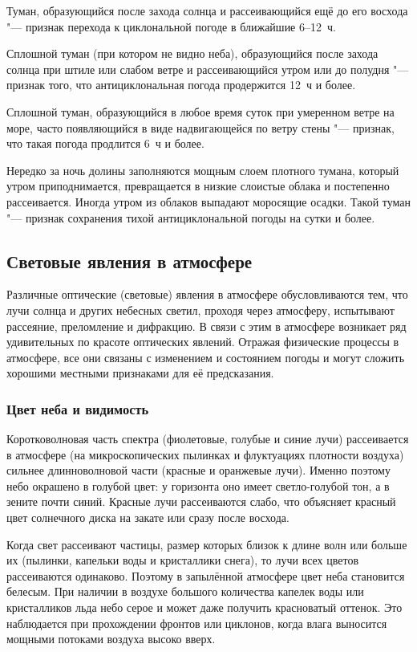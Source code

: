  Туман, образующийся после захода солнца и рассеивающийся ещё
до его восхода "--- признак перехода к циклональной погоде в ближайшие
6--12~ч.

 Сплошной туман (при котором не видно неба), образующийся после
захода солнца при штиле или слабом ветре и рассеивающийся утром или до
полудня "--- признак того, что антициклональная погода продержится 12~ч и
более.

 Сплошной туман, образующийся в любое время суток при умеренном
ветре на море, часто появляющийся в виде надвигающейся по ветру стены
"--- признак, что такая погода продлится 6~ч и более.

 Нередко за ночь долины заполняются мощным слоем плотного
тумана, который утром приподнимается, превращается в низкие слоистые
облака и постепенно рассеивается. Иногда утром из облаков выпадают
моросящие осадки. Такой туман "--- признак сохранения тихой
антициклональной погоды на сутки и более.

\subsection{Световые явления в атмосфере}

Различные оптические (световые) явления в атмосфере обусловливаются
тем, что лучи солнца и других небесных светил, проходя через
атмосферу, испытывают рассеяние, преломление и дифракцию. В связи с
этим в атмосфере возникает ряд удивительных по красоте оптических
явлений. Отражая физические процессы в атмосфере, все они связаны с
изменением и состоянием погоды и могут сложить хорошими местными
признаками для её предсказания.

\subsubsection{Цвет неба и видимость}

Коротковолновая часть спектра (фиолетовые, голубые и синие лучи)
рассеивается в атмосфере (на микроскопических пылинках и флуктуациях
плотности воздуха) сильнее длинноволновой части (красные и оранжевые
лучи). Именно поэтому небо окрашено в голубой цвет: у горизонта оно
имеет светло-голубой тон, а в зените почти синий. Красные лучи
рассеиваются слабо, что объясняет красный цвет солнечного диска на
закате или сразу после восхода.

Когда свет рассеивают частицы, размер которых близок к длине волн или
больше их (пылинки, капельки воды и кристаллики снега), то лучи всех
цветов рассеиваются одинаково. Поэтому в запылённой атмосфере цвет
неба становится белесым. При наличии в воздухе большого количества
капелек воды или кристалликов льда небо серое и может даже получить
красноватый оттенок. Это наблюдается при прохождении фронтов или
циклонов, когда влага выносится мощными потоками воздуха высоко вверх.

